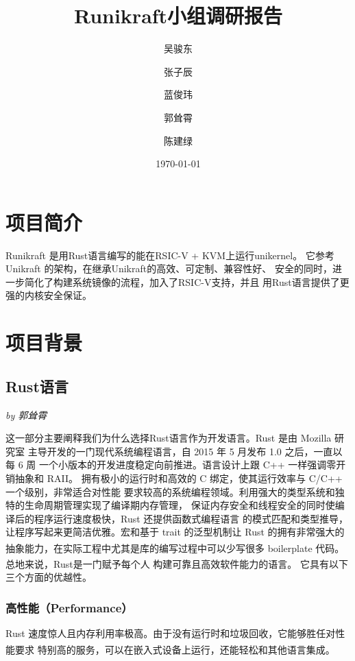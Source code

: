 \documentclass[UTF8,fontset=none,linespread=1.15]{ctexart}
\let\nosupcite\cite
\renewcommand*{\cite}[1]{\textsuperscript{\nosupcite{#1}}}
\newcommand{\sectionauthor}[1]{%
\vspace*{-5ex}
\noindent\textrm{\hfill\textit{by #1}}
\vspace*{2ex}\par}
\begin{document}
\sffamily %
\title{\bfseries Runikraft小组\quad 调研报告}
\author{吴骏东\and 张子辰\and 蓝俊玮\and 郭耸霄\and 陈建绿}
\date{\today}
\maketitle

\tableofcontents

\section{项目简介}
Runikraft 是用Rust语言编写的能在RSIC-V + KVM上运行unikernel。
它参考 Unikraft 的架构，在继承Unikraft的高效、可定制、兼容性好、
安全的同时，进一步简化了构建系统镜像的流程，加入了RSIC-V支持，并且
用Rust语言提供了更强的内核安全保证。
\section{项目背景}
\subsection{Rust语言}\sectionauthor{郭耸霄}

这一部分主要阐释我们为什么选择Rust语言作为开发语言。Rust 是由 Mozilla 研究室
主导开发的一门现代系统编程语言，自 2015 年 5 月发布 1.0 之后，一直以每 6 周
一个小版本的开发进度稳定向前推进。语言设计上跟 C++ 一样强调零开销抽象和 RAII。
拥有极小的运行时和高效的 C 绑定，使其运行效率与 C/C++ 一个级别，非常适合对性能
要求较高的系统编程领域。利用强大的类型系统和独特的生命周期管理实现了编译期内存管理，
保证内存安全和线程安全的同时使编译后的程序运行速度极快，Rust 还提供函数式编程语言
的模式匹配和类型推导，让程序写起来更简洁优雅。宏和基于 trait 的泛型机制让 Rust
的拥有非常强大的抽象能力，在实际工程中尤其是库的编写过程中可以少写很多 boilerplate
代码。\cite{bib:2-why-rust}
总地来说，Rust是一门赋予每个人 构建可靠且高效软件能力的语言。\cite{bib:1-rust-lang}
它具有以下三个方面的优越性。

\subsubsection{高性能（Performance）}

Rust 速度惊人且内存利用率极高。由于没有运行时和垃圾回收，它能够胜任对性能要求
特别高的服务，可以在嵌入式设备上运行，还能轻松和其他语言集成。\cite{bib:1-rust-lang}
\end{document}
